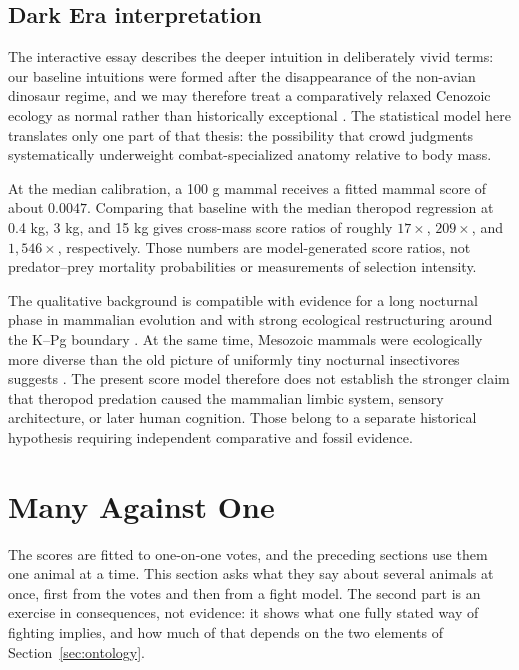 \documentclass[11pt]{article}
\begin{document}
\subsection{Dark Era interpretation}
The interactive essay describes the deeper intuition in deliberately vivid terms: our baseline intuitions were formed after the disappearance of the non-avian dinosaur regime, and we may therefore treat a comparatively relaxed Cenozoic ecology as normal rather than historically exceptional \cite{benanderDino2026}. The statistical model here translates only one part of that thesis: the possibility that crowd judgments systematically underweight combat-specialized anatomy relative to body mass.

At the median calibration, a 100 g mammal receives a fitted mammal score of about $0.0047$. Comparing that baseline with the median theropod regression at 0.4 kg, 3 kg, and 15 kg gives cross-mass score ratios of roughly $17\times$, $209\times$, and $1,546\times$, respectively. Those numbers are model-generated score ratios, not predator--prey mortality probabilities or measurements of selection intensity.

The qualitative background is compatible with evidence for a long nocturnal phase in mammalian evolution and with strong ecological restructuring around the K--Pg boundary \cite{maor2017nocturnal,wilson2012multituberculates}. At the same time, Mesozoic mammals were ecologically more diverse than the old picture of uniformly tiny nocturnal insectivores suggests \cite{hu2005repenomamus}. The present score model therefore does not establish the stronger claim that theropod predation caused the mammalian limbic system, sensory architecture, or later human cognition. Those belong to a separate historical hypothesis requiring independent comparative and fossil evidence.

\section{Many Against One}
\label{sec:groups}

The scores are fitted to one-on-one votes, and the preceding sections use them one animal at a time. This section asks what they say about several animals at once, first from the votes and then from a fight model. The second part is an exercise in consequences, not evidence: it shows what one fully stated way of fighting implies, and how much of that depends on the two elements of Section~\ref{sec:ontology}.
\end{document}
